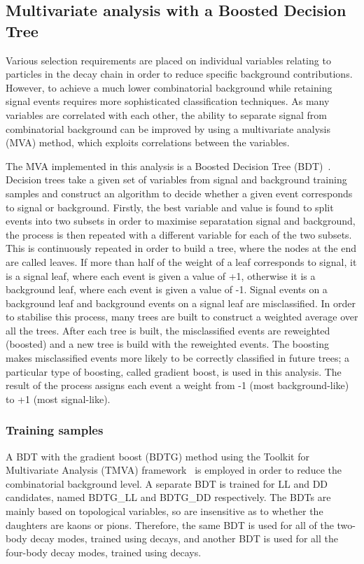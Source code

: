 \subsection{Multivariate analysis with a Boosted Decision Tree}
\label{sec:selection:bdt}

Various selection requirements are placed on individual variables relating to particles in the decay chain in order to reduce specific background contributions. However, to achieve a much lower combinatorial background while retaining signal events requires more sophisticated classification techniques. As many variables are correlated with each other, the ability to separate signal from combinatorial background can be improved by using a multivariate analysis (MVA) method, which exploits correlations between the variables. 

The MVA implemented in this analysis is a Boosted Decision Tree (BDT)~\cite{Breiman}. Decision trees take a given set of variables from signal and background training samples and construct an algorithm to decide whether a given event corresponds to signal or background. Firstly, the best variable and value is found to split events into two subsets in order to maximise separatation signal and background, the process is then repeated with a different variable for each of the two subsets. This is continuously repeated in order to build a tree, where the nodes at the end are called leaves. If more than half of the weight of a leaf corresponds to signal, it is a signal leaf, where each event is given a value of +1, otherwise it is a background leaf, where each event is given a value of -1. Signal events on a background leaf and background events on a signal leaf are misclassified. In order to stabilise this process, many trees are built to construct a weighted average over all the trees. After each tree is built, the misclassified events are reweighted (boosted) and a new tree is build with the reweighted events. The boosting makes misclassified events more likely to be correctly classified in future trees; a particular type of boosting, called gradient boost, is used in this analysis. The result of the process assigns each event a weight from -1 (most background-like) to +1 (most signal-like). 

\subsubsection{Training samples}

A BDT with the gradient boost (BDTG) method using the Toolkit for Multivariate Analysis (TMVA) framework~\cite{TMVA} is employed in order to reduce the combinatorial background level. A separate BDT is trained for LL and DD candidates, named BDTG\_LL and BDTG\_DD respectively. The BDTs are mainly based on topological variables, so are insensitive as to whether the \Dz daughters are kaons or pions. Therefore, the same BDT is used for all of the two-body \Dz decay modes, trained using \kpi decays, and another BDT is used for all the four-body \Dz decay modes, trained using \kpipipi decays. 

